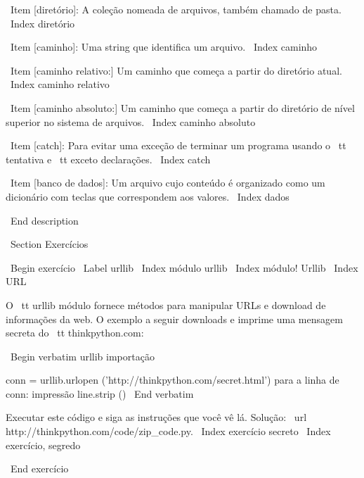 \documentclass[10pt]{book}
\begin{document}
{{{{{{{{{{{\ Item [diretório]: A coleção nomeada de arquivos, também chamado de pasta.
\ Index {diretório}

\ Item [caminho]: Uma string que identifica um arquivo.
\ Index {caminho}

\ Item [caminho relativo:] Um caminho que começa a partir do diretório atual.
\ Index {caminho relativo}

\ Item [caminho absoluto:] Um caminho que começa a partir do diretório de nível superior
no sistema de arquivos.
\ Index {caminho absoluto}

\ Item [catch]: Para evitar uma exceção de terminar
um programa usando o {\ tt tentativa}
e {\ tt exceto} declarações.
\ Index {catch}

\ Item [banco de dados]: Um arquivo cujo conteúdo é organizado como um dicionário
com teclas que correspondem aos valores.
\ Index {dados}

\ End {description}


\ Section {Exercícios}

\ Begin {} exercício
\ Label {} urllib
\ Index {módulo urllib}
\ Index {módulo! Urllib}
\ Index {URL}

O {\ tt urllib} módulo fornece métodos para manipular URLs
e download de informações da web. O exemplo a seguir
downloads e imprime uma mensagem secreta do {\ tt thinkpython.com}:

\ Begin {verbatim}
urllib importação

conn = urllib.urlopen ('http://thinkpython.com/secret.html')
para a linha de conn:
    impressão line.strip ()
\ End {verbatim}

Executar este código e siga as instruções que você vê lá.
Solução: \ url {http://thinkpython.com/code/zip_code.py}.
\ Index {exercício secreto}
\ Index {exercício, segredo}

\ End {} exercício




}}}}}}}}}}}
\end{document}

